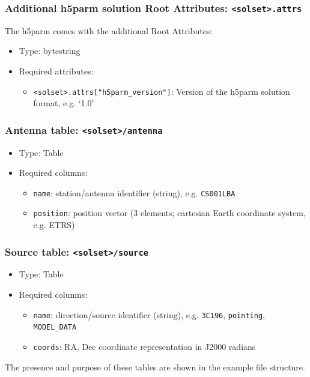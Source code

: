 \documentclass[a4paper,10pt,bibtotoc]{scrartcl}
\begin{document}
\subsubsection*{Additional h5parm solution Root Attributes: \texttt{<solset>.attrs}}
The h5parm comes with the additional Root Attributes:
\begin{itemize}
  \item Type: bytestring
  \item Required attributes:
  \begin{itemize}
    \item \texttt{<solset>.attrs["h5parm\_version"]}: Version of the h5parm solution format, e.g. `1.0'
  \end{itemize}
\end{itemize}


\subsubsection*{Antenna table: \texttt{<solset>/antenna}}
\begin{itemize}
  \item Type: Table
  \item Required columns:
  \begin{itemize}
    \item \texttt{name}: station/antenna identifier (string), e.g. \texttt{CS001LBA}
    \item \texttt{position}: position vector (3 elements; cartesian Earth coordinate system, e.g. ETRS)
  \end{itemize}
\end{itemize}

\subsubsection*{Source table: \texttt{<solset>/source}}
\begin{itemize}
  \item Type: Table
  \item Required columns:
  \begin{itemize}
    \item \texttt{name}: direction/source identifier (string), e.g. \texttt{3C196}, \texttt{pointing}, \texttt{MODEL\_DATA}
    \item \texttt{coords}: RA, Dec coordinate representation in J2000 radians
  \end{itemize}
\end{itemize}
The presence and purpose of these tables are shown in the example file structure. 
\end{document}
